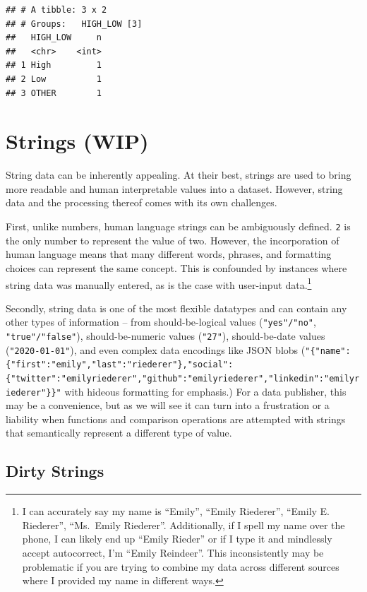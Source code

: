 \documentclass[
]{krantz}
\begin{document}
\begin{verbatim}
## # A tibble: 3 x 2
## # Groups:   HIGH_LOW [3]
##   HIGH_LOW     n
##   <chr>    <int>
## 1 High         1
## 2 Low          1
## 3 OTHER        1
\end{verbatim}

\hypertarget{strings-wip}{%
\section{Strings (WIP)}\label{strings-wip}}

String data can be inherently appealing. At their best, strings are used to bring more readable and human interpretable values into a dataset. However, string data and the processing thereof comes with its own challenges.

First, unlike numbers, human language strings can be ambiguously defined. \texttt{2} is the only number to represent the value of two. However, the incorporation of human language means that many different words, phrases, and formatting choices can represent the same concept. This is confounded by instances where string data was manually entered, as is the case with user-input data.\footnote{I can accurately say my name is ``Emily'', ``Emily Riederer'', ``Emily E. Riederer'', ``Ms.~Emily Riederer''. Additionally, if I spell my name over the phone, I can likely end up ``Emily Rieder'' or if I type it and mindlessly accept autocorrect, I'm ``Emily Reindeer''. This inconsistently may be problematic if you are trying to combine my data across different sources where I provided my name in different ways.}

Secondly, string data is one of the most flexible datatypes and can contain any other types of information -- from should-be-logical values (\texttt{"yes"/"no"}, \texttt{"true"/"false"}), should-be-numeric values (\texttt{"27"}), should-be-date values (\texttt{"2020-01-01"}), and even complex data encodings like JSON blobs (\texttt{"\{"name":\{"first":"emily","last":"riederer"\},"social":\{"twitter":"emilyriederer","github":"emilyriederer","linkedin":"emilyriederer"\}\}"} with hideous formatting for emphasis.) For a data publisher, this may be a convenience, but as we will see it can turn into a frustration or a liability when functions and comparison operations are attempted with strings that semantically represent a different type of value.

\hypertarget{dirty-strings}{%
\subsection{Dirty Strings}\label{dirty-strings}}
\end{document}
